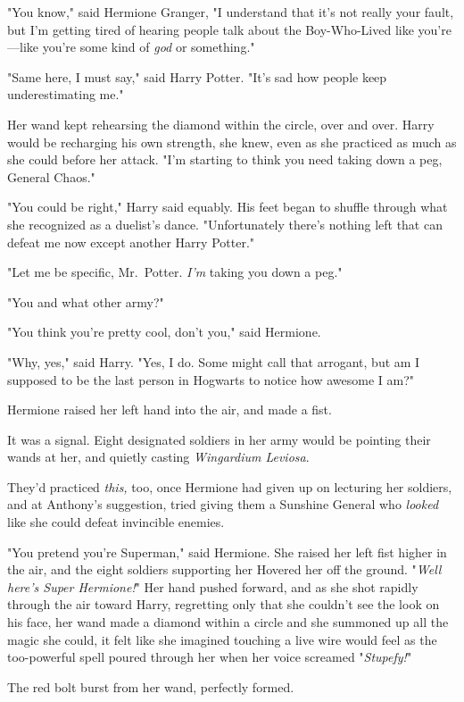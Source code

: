 "You know," said Hermione Granger, "I understand that it's not really your
fault, but I'm getting tired of hearing people talk about the Boy-Who-Lived
like you're---like you're some kind of \emph{god} or something."

"Same here, I must say," said Harry Potter. "It's sad how people keep
underestimating me."

Her wand kept rehearsing the diamond within the circle, over and over. Harry
would be recharging his own strength, she knew, even as she practiced as much
as she could before her attack. "I'm starting to think you need taking down a
peg, General Chaos."

"You could be right," Harry said equably. His feet began to shuffle through
what she recognized as a duelist's dance. "Unfortunately there's nothing left
that can defeat me now except another Harry Potter."

"Let me be specific, Mr.~Potter. \emph{I'm} taking you down a peg."

"You and what other army?"

"You think you're pretty cool, don't you," said Hermione.

"Why, yes," said Harry. "Yes, I do. Some might call that arrogant, but am I
supposed to be the last person in Hogwarts to notice how awesome I am?"

Hermione raised her left hand into the air, and made a fist.

It was a signal. Eight designated soldiers in her army would be pointing their
wands at her, and quietly casting \emph{Wingardium Leviosa}.

They'd practiced \emph{this,} too, once Hermione had given up on lecturing her
soldiers, and at Anthony's suggestion, tried giving them a Sunshine General who
\emph{looked} like she could defeat invincible enemies.

"You pretend you're Superman," said Hermione. She raised her left fist higher
in the air, and the eight soldiers supporting her Hovered her off the ground.
"\emph{Well here's Super Hermione!}" Her hand pushed forward, and as she shot
rapidly through the air toward Harry, regretting only that she couldn't see the
look on his face, her wand made a diamond within a circle and she summoned up
all the magic she could, it felt like she imagined touching a live wire would
feel as the too-powerful spell poured through her when her voice screamed
"\emph{Stupefy!}"

The red bolt burst from her wand, perfectly formed.

